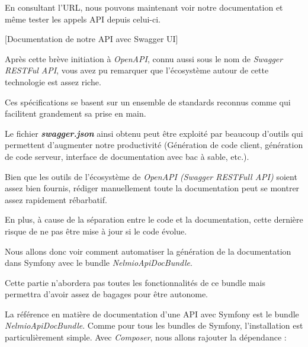 \documentclass[big]{zmdocument}
\begin{document}
En consultant l'URL, nous pouvons maintenant voir notre documentation et même tester les appels API depuis celui-ci.



[Documentation de notre API avec Swagger UI]


\horizontalLine



Après cette brève initiation à \textit{OpenAPI}, connu aussi sous le nom de \textit{Swagger RESTFul API}, vous avez pu remarquer que l’écosystème autour de cette technologie est assez riche.



Ces spécifications se basent sur un ensemble de standards reconnus comme  qui facilitent grandement sa prise en main.



Le fichier \textbf{\textit{swagger.json}} ainsi obtenu peut être exploité par beaucoup d'outils qui permettent d'augmenter notre productivité (Génération de code client, génération de code serveur, interface de documentation avec bac à sable, etc.).





Bien que les outils de l'écosystème de \textit{OpenAPI (Swagger RESTFull API)} soient assez bien fournis, rédiger manuellement toute la documentation peut se montrer assez rapidement rébarbatif.



En plus, à cause de la séparation entre le code et la documentation, cette dernière risque de ne pas être mise à jour si le code évolue.



Nous allons donc voir comment automatiser la génération de la documentation dans Symfony avec le bundle \textit{NelmioApiDocBundle}.



Cette partie n'abordera pas toutes les fonctionnalités de ce bundle mais permettra d'avoir assez de bagages pour être autonome.





La référence en matière de documentation d'une API avec Symfony est le bundle \textit{NelmioApiDocBundle}. Comme pour tous les bundles de Symfony, l'installation est particulièrement simple.
Avec \textit{Composer}, nous allons rajouter la dépendance :
\end{document}
